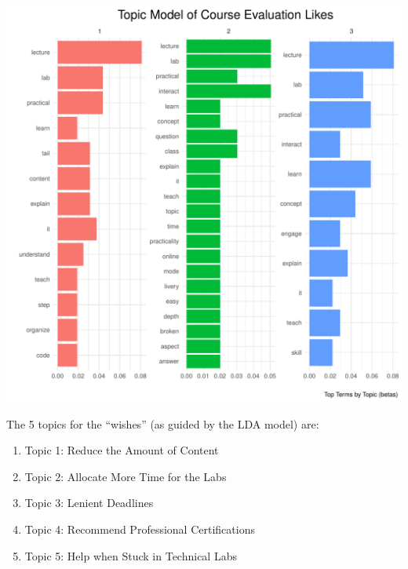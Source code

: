\documentclass[
]{article}
\begin{document}
\includegraphics{AnalysisOfCourseEvaluation-Notebook_files/figure-latex/visualizations_for_likes_topic_modelling-1.pdf}

\newpage

The 5 topics for the ``wishes'' (as guided by the LDA model) are:

\begin{enumerate}
\def\labelenumi{\arabic{enumi}.}
\item
  Topic 1: Reduce the Amount of Content
\item
  Topic 2: Allocate More Time for the Labs
\item
  Topic 3: Lenient Deadlines
\item
  Topic 4: Recommend Professional Certifications
\item
  Topic 5: Help when Stuck in Technical Labs
\end{enumerate}
\end{document}
